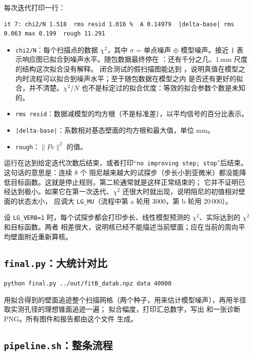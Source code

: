 \documentclass[11pt,a4paper,fontset=fandol]{ctexart}
\newcommand{\code}[1]{\texttt{#1}}
\begin{document}
每次迭代打印一行：
\begin{lstlisting}
it 7: chi2/N 1.518  rms resid 1.016 %  A 0.14979  |delta-base| rms 0.063 max 0.199  rough 11.291
\end{lstlisting}
\begin{itemize}
\item \code{chi2/N}：每个扫描点的数据 $\chi^2$，其中 $\sigma$ = 单点噪声 $\oplus$ 模型噪声。接近 1
表示响应图已拟合到噪声水平。随包数据最终停在 \ChiTwo：还有千分之几、1\,mm 尺度的结构这次拟合没有解释。
闭合测试的假扫描图能达到 \ClChiTwo，说明真值在模型之内时流程可以拟合到噪声水平；至于随包数据在模型之内
是否还有更好的拟合，并不清楚。$\chi^2/N$ 也不是标定过的拟合优度：等效的拟合参数个数是未知的。
\item \code{rms resid}：数据减模型的均方根（不是标准差），以平均信号的百分比表示。
\item \code{|delta-base|}：系数相对基态壁面的均方根和最大值，单位 mm。
\item \code{rough}：$\lVert Pc\rVert^2$ 的值。
\end{itemize}
运行在达到给定迭代次数后结束，或者打印“\code{no improving step; stop}”后结束。这句话的意思是：连续 8 个
阻尼越来越大的试探步（步长小到亚微米）都没能降低目标函数。这就是停止规则，第二轮通常就是这样正常结束的；
它并不证明已经达到极小。如果它在第一次迭代、$\chi^2$ 还很大时就出现，说明阻尼的初值相对壁面的状态太小，
应调大 \code{LG\_MU}（流程中第 a 轮用 3000，第 b 轮用 20\,000）。

设 \code{LG\_VERB=1} 时，每个试探步都会打印步长、线性模型预测的 $\chi^2$、实际达到的 $\chi^2$ 和目标函数。两者
相差很大，说明核已经不能描述当前壁面；应在当前的周向平均壁面附近重新算核。

\subsection{\texttt{final.py}：大统计对比}

\begin{lstlisting}
python final.py ../out/fitB_datab.npz data 40000
\end{lstlisting}
用拟合得到的壁面追迹整个扫描网格（两个种子，用来估计模型噪声），再用半径取实测孔径的理想锥面追迹一遍；
拟合幅度，打印汇总数字，写出  和一张诊断 PNG。所有图件和报告都由这个文件
生成。

\subsection{\texttt{pipeline.sh}：整条流程}
\end{document}

